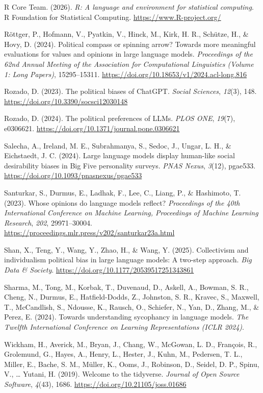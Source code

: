 \documentclass[
]{article}
\newlength{\cslhangindent}
\newenvironment{CSLReferences}[2] %
 {\begin{list}{}{%
  \setlength{\itemindent}{0pt}
  \setlength{\leftmargin}{0pt}
  \setlength{\parsep}{0pt}
  \ifodd #1
   \setlength{\leftmargin}{\cslhangindent}
   \setlength{\itemindent}{-1\cslhangindent}
  \fi
  \setlength{\itemsep}{#2\baselineskip}}}
 {\end{list}}
\begin{document}
\begin{CSLReferences}{1}{0}
R Core Team. (2026). \emph{R: A language and environment for statistical
computing}. R Foundation for Statistical Computing.
\url{https://www.R-project.org/}

Röttger, P., Hofmann, V., Pyatkin, V., Hinck, M., Kirk, H. R., Schütze,
H., \& Hovy, D. (2024). Political compass or spinning arrow? {Towards}
more meaningful evaluations for values and opinions in large language
models. \emph{Proceedings of the 62nd Annual Meeting of the Association
for Computational Linguistics (Volume 1: Long Papers)}, 15295--15311.
\url{https://doi.org/10.18653/v1/2024.acl-long.816}

Rozado, D. (2023). The political biases of {ChatGPT}. \emph{Social
Sciences}, \emph{12}(3), 148.
\url{https://doi.org/10.3390/socsci12030148}

Rozado, D. (2024). The political preferences of {LLMs}. \emph{PLOS ONE},
\emph{19}(7), e0306621.
\url{https://doi.org/10.1371/journal.pone.0306621}

Salecha, A., Ireland, M. E., Subrahmanya, S., Sedoc, J., Ungar, L. H.,
\& Eichstaedt, J. C. (2024). Large language models display human-like
social desirability biases in {Big Five} personality surveys. \emph{PNAS
Nexus}, \emph{3}(12), pgae533.
\url{https://doi.org/10.1093/pnasnexus/pgae533}

Santurkar, S., Durmus, E., Ladhak, F., Lee, C., Liang, P., \& Hashimoto,
T. (2023). Whose opinions do language models reflect? \emph{Proceedings
of the 40th International Conference on Machine Learning, Proceedings of
Machine Learning Research}, \emph{202}, 29971--30004.
\url{https://proceedings.mlr.press/v202/santurkar23a.html}

Shan, X., Teng, Y., Wang, Y., Zhao, H., \& Wang, Y. (2025). Collectivism
and individualism political bias in large language models: A two-step
approach. \emph{Big Data \& Society}.
\url{https://doi.org/10.1177/20539517251343861}

Sharma, M., Tong, M., Korbak, T., Duvenaud, D., Askell, A., Bowman, S.
R., Cheng, N., Durmus, E., Hatfield-Dodds, Z., Johnston, S. R., Kravec,
S., Maxwell, T., McCandlish, S., Ndousse, K., Rausch, O., Schiefer, N.,
Yan, D., Zhang, M., \& Perez, E. (2024). Towards understanding
sycophancy in language models. \emph{The Twelfth International
Conference on Learning Representations (ICLR 2024)}.

Wickham, H., Averick, M., Bryan, J., Chang, W., McGowan, L. D.,
François, R., Grolemund, G., Hayes, A., Henry, L., Hester, J., Kuhn, M.,
Pedersen, T. L., Miller, E., Bache, S. M., Müller, K., Ooms, J.,
Robinson, D., Seidel, D. P., Spinu, V., \ldots{} Yutani, H. (2019).
Welcome to the tidyverse. \emph{Journal of Open Source Software},
\emph{4}(43), 1686. \url{https://doi.org/10.21105/joss.01686}

\end{CSLReferences}
\end{document}
